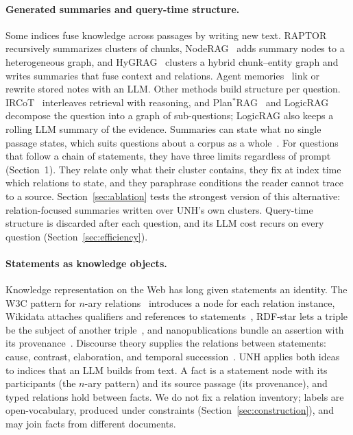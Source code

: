 \documentclass[sigconf, review, anonymous]{acmart}
\newcommand{\sys}{UNH}
\begin{document}
\paragraph{Generated summaries and query-time structure.}
Some indices fuse knowledge across passages by writing new text. RAPTOR~\cite{sarthi2024raptor} recursively summarizes clusters of chunks, NodeRAG~\cite{xu2025noderag} adds summary nodes to a heterogeneous graph, and HyGRAG~\cite{zhong2026hygrag} clusters a hybrid chunk--entity graph and writes summaries that fuse context and relations. Agent memories~\cite{xu2025amem,qian2024memorag} link or rewrite stored notes with an LLM. Other methods build structure per question. IRCoT~\cite{trivedi2023interleaving} interleaves retrieval with reasoning, and Plan$^{*}$RAG~\cite{verma2025planrag} and LogicRAG~\cite{chen2026logicrag} decompose the question into a graph of sub-questions; LogicRAG also keeps a rolling LLM summary of the evidence. Summaries can state what no single passage states, which suits questions about a corpus as a whole~\cite{edge2024local}. For questions that follow a chain of statements, they have three limits regardless of prompt (Section~1). They relate only what their cluster contains, they fix at index time which relations to state, and they paraphrase conditions the reader cannot trace to a source. Section~\ref{sec:ablation} tests the strongest version of this alternative: relation-focused summaries written over \sys{}'s own clusters. Query-time structure is discarded after each question, and its LLM cost recurs on every question (Section~\ref{sec:efficiency}).

\paragraph{Statements as knowledge objects.}
Knowledge representation on the Web has long given statements an identity. The W3C pattern for $n$-ary relations~\cite{noy2006nary} introduces a node for each relation instance, Wikidata attaches qualifiers and references to statements~\cite{vrandecic2014wikidata}, RDF-star lets a triple be the subject of another triple~\cite{hartig2017rdfstar}, and nanopublications bundle an assertion with its provenance~\cite{groth2010nanopub}. Discourse theory supplies the relations between statements: cause, contrast, elaboration, and temporal succession~\cite{mann1988rhetorical,prasad2017penn}. \sys{} applies both ideas to indices that an LLM builds from text. A fact is a statement node with its participants (the $n$-ary pattern) and its source passage (its provenance), and typed relations hold between facts. We do not fix a relation inventory; labels are open-vocabulary, produced under constraints (Section~\ref{sec:construction}), and may join facts from different documents.
\end{document}
